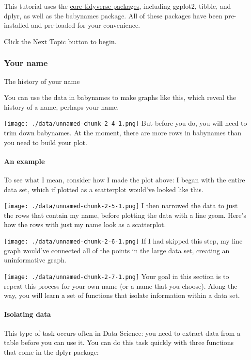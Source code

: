 \documentclass[
]{article}
\begin{document}
This tutorial uses the \href{http://tidyverse.org/}{core tidyverse
packages}, including ggplot2, tibble, and dplyr, as well as the
babynames package. All of these packages have been pre-installed and
pre-loaded for your convenience.

Click the Next Topic button to begin.

\hypertarget{your-name}{%
\subsubsection{Your name}\label{your-name}}

The history of your name

You can use the data in babynames to make graphs like this, which reveal
the history of a name, perhaps your name.

\texttt{[image: ./data/unnamed-chunk-2-4-1.png]} But before you do, you
will need to trim down babynames. At the moment, there are more rows in
babynames than you need to build your plot.

\hypertarget{an-example}{%
\paragraph{An example}\label{an-example}}

To see what I mean, consider how I made the plot above: I began with the
entire data set, which if plotted as a scatterplot would've looked like
this.

\texttt{[image: ./data/unnamed-chunk-2-5-1.png]} I then narrowed the
data to just the rows that contain my name, before plotting the data
with a line geom. Here's how the rows with just my name look as a
scatterplot.

\texttt{[image: ./data/unnamed-chunk-2-6-1.png]} If I had skipped this
step, my line graph would've connected all of the points in the large
data set, creating an uninformative graph.

\texttt{[image: ./data/unnamed-chunk-2-7-1.png]} Your goal in this
section is to repeat this process for your own name (or a name that you
choose). Along the way, you will learn a set of functions that isolate
information within a data set.

\hypertarget{isolating-data}{%
\paragraph{Isolating data}\label{isolating-data}}

This type of task occurs often in Data Science: you need to extract data
from a table before you can use it. You can do this task quickly with
three functions that come in the dplyr package:
\end{document}
